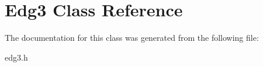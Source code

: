 \hypertarget{class_edg3}{}\section{Edg3 Class Reference}
\label{class_edg3}


The documentation for this class was generated from the following file\+:\begin{DoxyCompactItemize}
\item 
edg3.\+h\end{DoxyCompactItemize}
